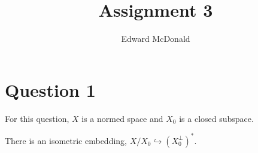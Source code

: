 \documentclass{unswmaths}
\begin{document}
\subject{Functional Analysis}
\author{Edward McDonald}
\title{Assignment 3}


\newcommand{\Real}{\operatorname{Re}}
\newcommand{\Img}{\operatorname{Im}}
\newcommand{\lan}{\langle}
\newcommand{\ran}{\rangle}
\newcommand{\Proj}{\mathbb{P}_+}
\newcommand{\isom}{\cong}
\newcommand{\id}{{\operatorname{id}}}


\unswtitle{}
\section*{Question 1}
For this question, $X$ is a normed space and $X_0$ is a closed subspace.

\begin{proposition}
    There is an isometric embedding, $X/X_0 \hookrightarrow (X_0^\perp)^*$.
\end{proposition}
\end{document}
